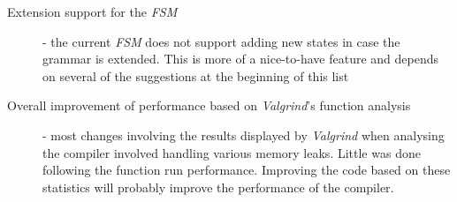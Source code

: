 \begin{description}
  	\item[Extension support for the \textit{FSM}] - the current \textit{FSM} does not support adding new states in case the grammar is extended. This is more of a nice-to-have feature and depends on several of the suggestions at the beginning of this list
  	\item[Overall improvement of performance based on \textit{Valgrind}'s function analysis] - most changes involving the results displayed by \textit{Valgrind} when analysing the compiler involved handling various memory leaks. Little was done following the function run performance. Improving the code based on these statistics will probably improve the performance of the compiler.
  \end{description}